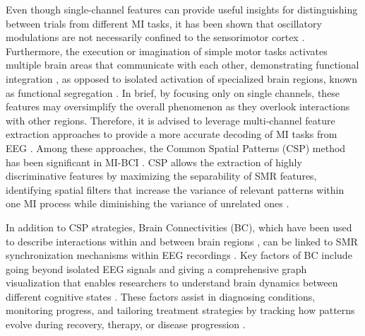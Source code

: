 Even though single-channel features can provide useful insights for distinguishing between trials from different MI tasks, it has been shown that oscillatory modulations are not necessarily confined to the sensorimotor cortex \cite{singh2021comprehensive}. Furthermore, the execution or imagination of simple motor tasks activates multiple brain areas that communicate with each other, demonstrating functional integration \cite{ladda2021using}, as opposed to isolated activation of specialized brain regions, known as functional segregation \cite{chiarion2023connectivity}. In brief, by focusing only on single channels, these features may oversimplify the overall phenomenon as they overlook interactions with other regions. Therefore, it is advised to leverage multi-channel feature extraction approaches to provide a more accurate decoding of MI tasks from EEG \cite{leeuwis2021functional}. Among these approaches, the Common Spatial Patterns (CSP) method has been significant in MI-BCI \cite{yang2021multi}. CSP allows the extraction of highly discriminative features by maximizing the separability of SMR features, identifying spatial filters that increase the variance of relevant patterns within one MI process while diminishing the variance of unrelated ones \cite{gaur2021sliding}.

In addition to CSP strategies, Brain Connectivities (BC), which have been used to describe interactions within and between brain regions \cite{ismail2020graph}, can be linked to SMR synchronization mechanisms within EEG recordings \cite{maksimenko2017macroscopic, chiarion2023connectivity}. Key factors of BC include going beyond isolated EEG signals and giving a comprehensive graph visualization that enables researchers to understand brain dynamics between different cognitive states \cite{collazos2023posthoc, grana2023review, tafreshi2019functional, van2014functional, sakkalis2011review}. These factors assist in diagnosing conditions, monitoring progress, and tailoring treatment strategies by tracking how patterns evolve during recovery, therapy, or disease progression \cite{yen2023exploring, lim2021post}. 


